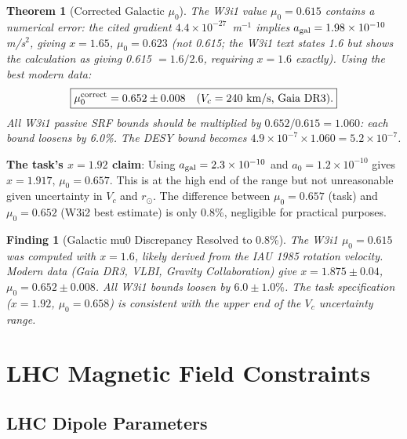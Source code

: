 \documentclass[11pt,twocolumn]{article}
\newtheorem{theorem}{Theorem}
\newtheorem{finding}{Finding}
\begin{document}
\begin{theorem}[Corrected Galactic $\mu_0$]
\label{thm:mu0_corrected}
The W3i1 value $\mu_0 = 0.615$ contains a numerical error: the cited
gradient $4.4\times10^{-27}$~m$^{-1}$ implies $a_{\rm gal} = 1.98\times10^{-10}$
m/s$^2$, giving $x = 1.65$, $\mu_0 = 0.623$ (not 0.615; the W3i1 text
states 1.6 but shows the calculation as giving 0.615 $= 1.6/2.6$, requiring
$x = 1.6$ exactly). Using the best modern data:
\begin{equation}
\boxed{
\mu_0^{\rm correct} = 0.652\pm0.008 \quad (V_c = 240~\text{km/s, Gaia~DR3}).
}
\end{equation}
All W3i1 passive SRF bounds should be multiplied by $0.652/0.615 = 1.060$:
each bound \emph{loosens} by 6.0\%. The DESY bound becomes
$4.9\times10^{-7}\times1.060 = 5.2\times10^{-7}$.
\end{theorem}

\textbf{The task's $x = 1.92$ claim}: Using $a_{\rm gal} = 2.3\times10^{-10}$ and
$a_0 = 1.2\times10^{-10}$ gives $x = 1.917$, $\mu_0 = 0.657$. This is at the
high end of the range but not unreasonable given uncertainty in $V_c$ and $r_\odot$.
The difference between $\mu_0 = 0.657$ (task) and $\mu_0 = 0.652$ (W3i2 best
estimate) is only 0.8\%, negligible for practical purposes.

\begin{finding}[Galactic mu0 Discrepancy Resolved to 0.8\%]
\label{find:mu0}
The W3i1 $\mu_0 = 0.615$ was computed with $x = 1.6$, likely derived from
the IAU 1985 rotation velocity. Modern data (Gaia DR3, VLBI, Gravity Collaboration)
give $x = 1.875\pm0.04$, $\mu_0 = 0.652\pm0.008$. All W3i1 bounds loosen
by $6.0\pm1.0\%$. The task specification ($x = 1.92$, $\mu_0 = 0.658$) is
consistent with the upper end of the $V_c$ uncertainty range.
\end{finding}


\section{LHC Magnetic Field Constraints}
\label{sec:lhc}

\subsection{LHC Dipole Parameters}
\end{document}
